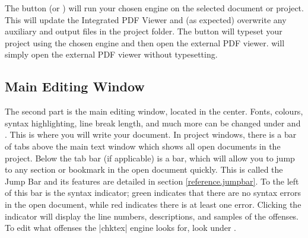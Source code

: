 The  button (or ) will run your chosen engine on the selected document or project. This will update the Integrated PDF Viewer and (as expected) overwrite any auxiliary and output files in the project folder. The  button will typeset your project using the chosen engine and then open the external PDF viewer.  will simply open the external PDF viewer without typesetting.

\subsection{Main Editing Window}

The second part is the main editing window, located in the center. Fonts, colours, syntax highlighting, line break length, and much more can be changed under  and . This is where you will write your document. In project windows, there is a bar of tabs above the main text window which shows all open documents in the project. Below the tab bar (if applicable) is a  bar, which will allow you to jump to any section or bookmark in the open document quickly. This is called the Jump Bar and its features are detailed in section \ref{reference.jumpbar}. To the left of this bar is the syntax indicator; green indicates that there are no syntax errors in the open document, while red indicates there is at least one error. Clicking the indicator will display the line numbers, descriptions, and samples of the offenses. To edit what offenses the |chktex| engine looks for, look under .


